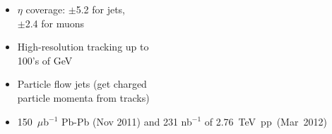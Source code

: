 \documentclass[compress]{beamer}
\begin{document}
\begin{frame}
\vspace{-3.5 cm}
\begin{itemize}
\item $\eta$ coverage: $\pm$5.2 for jets, \\ $\pm$2.4 for muons
\item High-resolution tracking up to \\ 100's of GeV
\item Particle flow jets (get charged \\ particle momenta from tracks)
\item 150~$\mu$b$^{-1}$ Pb-Pb {\scriptsize (Nov 2011)} and 231 nb$^{-1}$ of \mbox{2.76~TeV pp {\scriptsize (Mar 2012)}\hspace{-2 cm}}
\end{itemize}
\end{frame}
\end{document}
